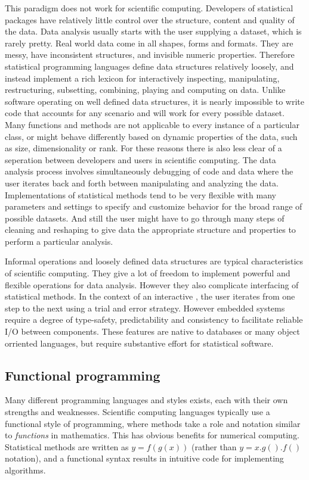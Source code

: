 This paradigm does not work for scientific computing. Developers of statistical packages have relatively little control over the structure, content and quality of the data. Data analysis usually starts with the user supplying a dataset, which is rarely pretty. Real world data come in all shapes, forms and formats. They are messy, have inconsistent structures, and invisible numeric properties. Therefore statistical programming languages define data structures relatively loosely, and instead implement a rich lexicon for interactively inspecting, manipulating, restructuring, subsetting, combining, playing and computing on data. Unlike software operating on well defined data structures, it is nearly impossible to write code that accounts for any scenario and will work for every possible dataset. Many functions and methods are not applicable to every instance of a particular class, or might behave differently based on dynamic properties of the data, such as size, dimensionality or rank. For these reasons there is also less clear of a seperation between developers and users in scientific computing. The data analysis process involves simultaneously debugging of code and data where the user iterates back and forth between manipulating and analyzing the data. Implementations of statistical methods tend to be very flexible with many parameters and settings to specify and customize behavior for the broad range of possible datasets. And still the user might have to go through many steps of cleaning and reshaping to give data the appropriate structure and properties to perform a particular analysis. 

Informal operations and loosely defined data structures are typical characteristics of scientific computing. They give a lot of freedom to implement powerful and flexible operations for data analysis. However they also complicate interfacing of statistical methods. In the context of an interactive \UI, the user iterates from one step to the next using a trial and error strategy. However embedded systems require a degree of type-safety, predictability and consistency to facilitate reliable I/O between components. These features are native to databases or many object orriented languages, but require substantive effort for statistical software. 


\subsection{Functional programming}

Many different programming languages and styles exists, each with their own strengths and weaknesses. Scientific computing languages typically use a functional style of programming, where methods take a role and notation similar to \emph{functions} in mathematics. This has obvious benefits for numerical computing. Statistical methods are written as $y = f(g(x))$ (rather than $y = x.g().f()$ notation), and a functional syntax results in intuitive code for implementing algorithms. 


